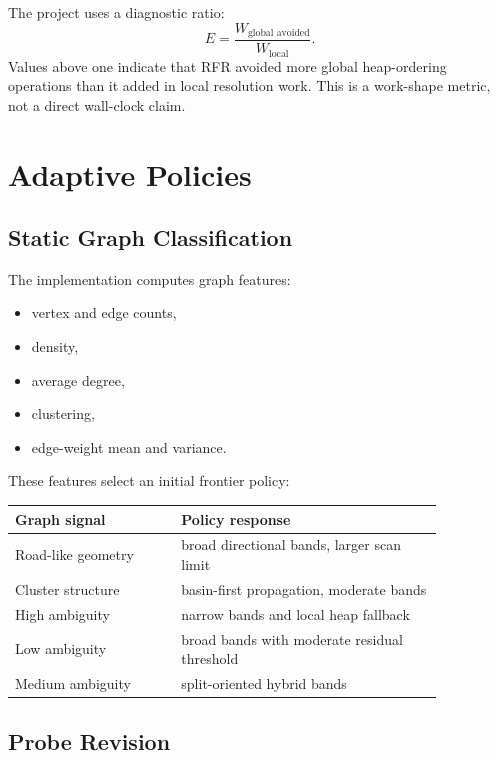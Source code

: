 \documentclass[11pt]{article}
\newcommand{\RFR}{\textsc{RFR}}
\begin{document}
The project uses a diagnostic ratio:
\[
  E = \frac{W_{\text{global avoided}}}{W_{\text{local}}}.
\]
Values above one indicate that \RFR{} avoided more global heap-ordering operations than it added in local resolution work. This is a work-shape metric, not a direct wall-clock claim.

\section{Adaptive Policies}
\label{sec:adaptive}

\subsection{Static Graph Classification}

The implementation computes graph features:

\begin{itemize}
  \item vertex and edge counts,
  \item density,
  \item average degree,
  \item clustering,
  \item edge-weight mean and variance.
\end{itemize}

These features select an initial frontier policy:

\begin{center}
\begin{tabular}{p{0.33\linewidth}p{0.52\linewidth}}
\toprule
Graph signal & Policy response \\
\midrule
Road-like geometry & broad directional bands, larger scan limit \\
Cluster structure & basin-first propagation, moderate bands \\
High ambiguity & narrow bands and local heap fallback \\
Low ambiguity & broad bands with moderate residual threshold \\
Medium ambiguity & split-oriented hybrid bands \\
\bottomrule
\end{tabular}
\end{center}

\subsection{Probe Revision}
\end{document}
